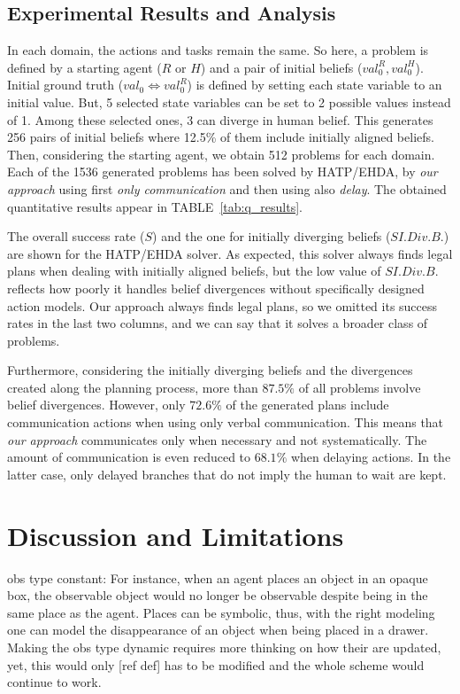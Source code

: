 {\subsection{Experimental Results and Analysis}

In each domain, the actions and tasks remain the same. So here, a problem is defined by a starting agent ($R$ or $H$) and a pair of initial beliefs ($val^R_0, val^H_ 0$).
Initial ground truth ($val_0 \Leftrightarrow val^R_0$) is defined by setting each state variable to an initial value. But, 5 selected state variables can be set to 2 possible values instead of 1. Among these selected ones, 3 can diverge in human belief. This generates 256 pairs of initial beliefs where 12.5\% of them include initially aligned beliefs. Then, considering the starting agent, we obtain 512 problems for each domain. 
Each of the 1536 generated problems has been solved by HATP/EHDA, by \textit{our approach} using first \textit{only communication} and then using also \textit{delay}.
The obtained quantitative results appear in TABLE~\ref{tab:q_results}.
 
The overall success rate ($S$) and the one for initially diverging beliefs ($S I.Div.B.$) are shown for the HATP/EHDA solver. As expected, this solver always finds legal plans when dealing with initially aligned beliefs, but the low value of $S I.Div.B.$ reflects how poorly it handles belief divergences without specifically designed action models.
Our approach always finds legal plans, so we omitted its success rates in the last two columns, and we can say that it solves a broader class of problems.

Furthermore, considering the initially diverging beliefs and the divergences created along the planning process, more than $87.5\%$ of all problems involve belief divergences. 
However, only $72.6\%$ of the generated plans include communication actions when using only verbal communication.
This means that \textit{our approach} communicates only when necessary and not systematically. 
The amount of communication is even reduced to $68.1\%$ when delaying actions. In the latter case, only delayed branches that do not imply the human to wait are kept. 

\section{Discussion and Limitations}


obs type constant: For instance, when an agent places an object in an opaque box, the observable object would no longer be observable despite being in the same place as the agent. Places can be symbolic, thus, with the right modeling one can model the disappearance of an object when being placed in a drawer. Making the obs type dynamic requires more thinking on how their are updated, yet, this would only [ref def] has to be modified and the whole scheme would continue to work.

}
